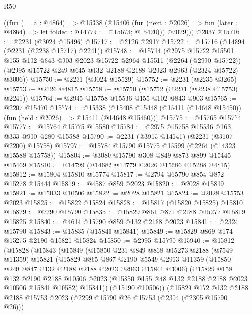 \begin{lexlean}{R50}
\begin{coremodule}
        ((fun (__a : @4864) =>
        @15338
          (@15406
            (fun (next : @2026) => fun (later : @4864) => let folded : @14779 := @15673; @15420)))
          @2029)))
    @2037
@15716 := @2231 (@3024 @15496)
@15717 := @2126 @2917
@15722 := @15716 (@14894 (@2231 (@2238 @15717) @2241))
@15748 := @15714
    (@2975
      @15722
      @15501
      @155
      @102
      @843
      @903
      @2023
      @15722
      @2964
      @15511
      (@2264 (@2990 @15722))
      (@2995 @15722 @249 @645 @132 @2188 @2188 @2023 @2963 (@2324 @15722) @3006))
@15750 := @2231 (@3024 @15529)
@15752 := @2231 (@2235 @3265)
@15753 := @2126 @4815
@15758 := @15750 (@15752 (@2231 (@2238 @15753) @2241))
@15764 := @2945 @15758 @15536 @155 @102 @843 @903
@15765 := @2207 @15470
@15774 := @15338
    (@15408 @15448 (@15411 (@14648 @15450)) (fun (held : @2026) => @15411 (@14648 @15460)))
@15775 := @15765 @15774
@15777 := @15764 @15775 @15580
@15784 := @2975 @15758 @15536 @163 @333 @900 @280 @15588
@15790 := @2231 (@3913 @14641) (@2231 (@3107 @2200) @15758)
@15797 := @15784 @15790 @15775 @15599 (@2264 (@14323 @15588 @15758))
@15804 := @3080 @15790 @308 @849 @873 @899 @15445 @15469
@15810 := @14799 (@14682 @14779 @2026 @15286 @15288 @4815)
@15812 := @15804 @15810 @15774
@15817 := @2794 @15790 @854 @872 @15278 @15444
@15819 := @4587 @859 @2023
@15820 := @2028 @15819
@15821 := @15033 @10506
@15822 := @2028 @15821
@15824 := @2028 @15753 @2023
@15825 := @15822 @15824
@15828 := @15817 (@15820 @15825) @15810
@15829 := @2290 @15790
@15835 := @15829 @861 @871 @2188 @15277 @15819 @15825
@15840 := @4614 @15790 @859 @132 @2188 @2023
@15841 := @2324 @15790
@15843 := @15835 (@15840 @15841)
@15849 := @15829 @869 @174 @15275 @2190 @15821 @15824
@15850 := @2995 @15790
@15940 := @15812
    (@15828
      (@15843
        (@15849
          (@15850
            @231
            @849
            @868
            @15273
            @2188
            (@7549 @11359)
            @15821
            (@15829
              @865
              @867
              @2190
              @5549
              @2963
              @11359
              (@15850 @249 @847 @132 @2188 @2188 @2023 @2963 @15841 @3006)
              (@15829
                @158
                @132
                @2190
                @2188
                @10506
                @2023
                (@15850 @155 @48 @132 @2188 @2188 @2023 @10506 @15841 @10582)
                @15841))
            (@15190 @10506))
          (@15829
            @172
            @132
            @2188
            @2188
            @15753
            @2023
            (@2299 @15790 @26 @15753 (@2304 (@2305 @15790 @26)))

\end{coremodule}
\end{lexlean}
